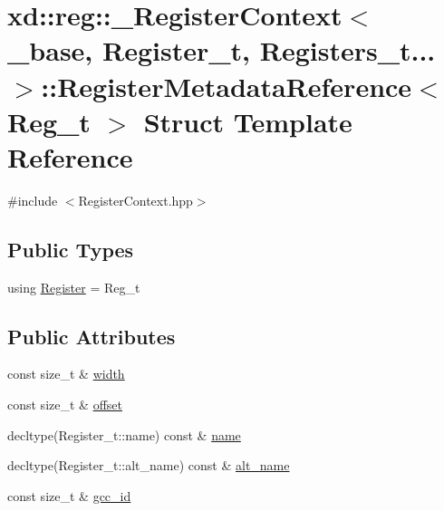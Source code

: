 \hypertarget{structxd_1_1reg_1_1___register_context_3_01__base_00_01_register__t_00_01_registers__t_8_8_8_01_fe5bcf2cd3858a6b9eb182cc9b3be39a}{}\section{xd\+:\+:reg\+:\+:\+\_\+\+Register\+Context$<$ \+\_\+base, Register\+\_\+t, Registers\+\_\+t... $>$\+:\+:Register\+Metadata\+Reference$<$ Reg\+\_\+t $>$ Struct Template Reference}
\label{structxd_1_1reg_1_1___register_context_3_01__base_00_01_register__t_00_01_registers__t_8_8_8_01_fe5bcf2cd3858a6b9eb182cc9b3be39a}


{\ttfamily \#include $<$Register\+Context.\+hpp$>$}

\subsection*{Public Types}
\begin{DoxyCompactItemize}
\item 
using \mbox{\hyperlink{structxd_1_1reg_1_1___register_context_3_01__base_00_01_register__t_00_01_registers__t_8_8_8_01_fe5bcf2cd3858a6b9eb182cc9b3be39a_a303153e0abe955c9357941a7b77b5dcc}{Register}} = Reg\+\_\+t
\end{DoxyCompactItemize}
\subsection*{Public Attributes}
\begin{DoxyCompactItemize}
\item 
const size\+\_\+t \& \mbox{\hyperlink{structxd_1_1reg_1_1___register_context_3_01__base_00_01_register__t_00_01_registers__t_8_8_8_01_fe5bcf2cd3858a6b9eb182cc9b3be39a_a7afb4ae2d9682b7bfc2e809589a638c3}{width}}
\item 
const size\+\_\+t \& \mbox{\hyperlink{structxd_1_1reg_1_1___register_context_3_01__base_00_01_register__t_00_01_registers__t_8_8_8_01_fe5bcf2cd3858a6b9eb182cc9b3be39a_a6c0bbda1a3fe30a3366df1093160cba9}{offset}}
\item 
decltype(Register\+\_\+t\+::name) const  \& \mbox{\hyperlink{structxd_1_1reg_1_1___register_context_3_01__base_00_01_register__t_00_01_registers__t_8_8_8_01_fe5bcf2cd3858a6b9eb182cc9b3be39a_a4f7a104f913255f12254b1490e48f434}{name}}
\item 
decltype(Register\+\_\+t\+::alt\+\_\+name) const  \& \mbox{\hyperlink{structxd_1_1reg_1_1___register_context_3_01__base_00_01_register__t_00_01_registers__t_8_8_8_01_fe5bcf2cd3858a6b9eb182cc9b3be39a_a7d7949d935f9be122a6f92a33884ed07}{alt\+\_\+name}}
\item 
const size\+\_\+t \& \mbox{\hyperlink{structxd_1_1reg_1_1___register_context_3_01__base_00_01_register__t_00_01_registers__t_8_8_8_01_fe5bcf2cd3858a6b9eb182cc9b3be39a_a5f60dbd094b9dcd32fe1667ecf14f166}{gcc\+\_\+id}}
\end{DoxyCompactItemize}


